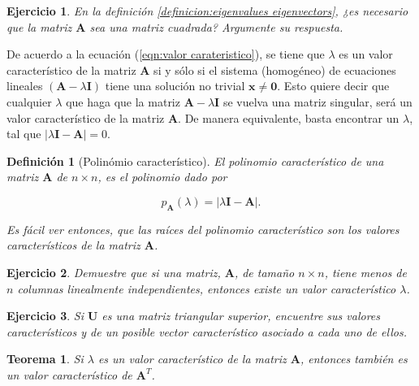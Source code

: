 \documentclass[11pt]{report}
\theoremstyle{break}
\newtheorem{definicion}{Definición}[chapter]
\newtheorem{teorema}{Teorema}[chapter]
\newtheorem{ejercicio}{Ejercicio}[chapter]
\theoremstyle{break}
\newcommand{\matdim}[2]{$#1 \times #2$}
\begin{document}
\begin{ejercicio}
En la definición \ref{definicion:eigenvalues eigenvectors}, ¿es necesario que la matriz $\bm{A}$ sea una matriz cuadrada? Argumente su respuesta.
\end{ejercicio}

De acuerdo a la ecuación (\ref{eqn:valor carateristico}), se tiene que $\lambda$ es un valor característico de la matriz $\bm{A}$ si y sólo si el sistema (homogéneo) de ecuaciones lineales $\left( \bm{A} - \lambda \bm{I} \right)$ tiene una solución no trivial $\bm{x} \neq \bm{0}$. Esto quiere decir que cualquier $\lambda$ que haga que la matriz  $\bm{A} - \lambda \bm{I}$ se vuelva una matriz singular, será un valor característico de la matriz $\bm{A}$. De manera equivalente, basta  encontrar un $\lambda$, tal que $|\lambda \bm{I} - \bm{A}| = 0.$

\begin{definicion}[Polinómio característico]
\label{definicion:polinomio caracteristico}
El polinomio característico de una matriz $\bm{A}$ de \matdim{n}{n}, es el polinomio dado por

\begin{equation}
p_{\bm{A}}(\lambda) = \left| \lambda \bm{I} - \bm{A} \right|. \label{eqn:polinomio caracteristico}
\end{equation}

Es fácil ver entonces, que las raíces del polinomio característico son los valores característicos de la matriz $\bm{A}$.
\end{definicion}

\begin{ejercicio}
Demuestre que si una matriz, $\bm{A}$, de tamaño \matdim{n}{n}, tiene menos de $n$ columnas linealmente independientes, entonces existe un valor característico $\lambda$.
\end{ejercicio}

\begin{ejercicio}
Si $\bm{U}$ es una matriz triangular superior, encuentre sus valores característicos y de un posible vector característico asociado a cada uno de ellos.
\end{ejercicio}

\begin{teorema}
Si $\lambda$ es un valor característico de la matriz $\bm{A}$, entonces también es un valor característico de $\bm{A}^{T}$.
\end{teorema}
\end{document}
